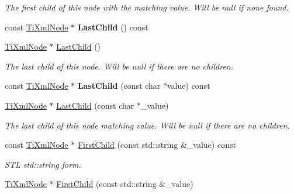 \begin{DoxyCompactItemize}
\begin{DoxyCompactList}\small\item\em The first child of this node with the matching \textquotesingle{}value\textquotesingle{}. Will be null if none found. \end{DoxyCompactList}\item 
const \hyperlink{class_ti_xml_node}{Ti\+Xml\+Node} $\ast$ {\bfseries Last\+Child} () const \hypertarget{class_ti_xml_node_a6d671107e00cca1d28cb2d7f3a87a21e}{}\label{class_ti_xml_node_a6d671107e00cca1d28cb2d7f3a87a21e}

\item 
\hyperlink{class_ti_xml_node}{Ti\+Xml\+Node} $\ast$ \hyperlink{class_ti_xml_node_a6432d2b2495f6caf9cb4278df706a031}{Last\+Child} ()\hypertarget{class_ti_xml_node_a6432d2b2495f6caf9cb4278df706a031}{}\label{class_ti_xml_node_a6432d2b2495f6caf9cb4278df706a031}

\begin{DoxyCompactList}\small\item\em The last child of this node. Will be null if there are no children. \end{DoxyCompactList}\item 
const \hyperlink{class_ti_xml_node}{Ti\+Xml\+Node} $\ast$ {\bfseries Last\+Child} (const char $\ast$value) const \hypertarget{class_ti_xml_node_acdd3fdc436aa7433023310a041e5e63f}{}\label{class_ti_xml_node_acdd3fdc436aa7433023310a041e5e63f}

\item 
\hyperlink{class_ti_xml_node}{Ti\+Xml\+Node} $\ast$ \hyperlink{class_ti_xml_node_abad5bf1059c48127b958711ef89e8e5d}{Last\+Child} (const char $\ast$\+\_\+value)\hypertarget{class_ti_xml_node_abad5bf1059c48127b958711ef89e8e5d}{}\label{class_ti_xml_node_abad5bf1059c48127b958711ef89e8e5d}

\begin{DoxyCompactList}\small\item\em The last child of this node matching \textquotesingle{}value\textquotesingle{}. Will be null if there are no children. \end{DoxyCompactList}\item 
const \hyperlink{class_ti_xml_node}{Ti\+Xml\+Node} $\ast$ \hyperlink{class_ti_xml_node_a07f6200a5956c723c5b52d70f29c46f6}{First\+Child} (const std\+::string \&\+\_\+value) const \hypertarget{class_ti_xml_node_a07f6200a5956c723c5b52d70f29c46f6}{}\label{class_ti_xml_node_a07f6200a5956c723c5b52d70f29c46f6}

\begin{DoxyCompactList}\small\item\em S\+TL std\+::string form. \end{DoxyCompactList}\item 
\hyperlink{class_ti_xml_node}{Ti\+Xml\+Node} $\ast$ \hyperlink{class_ti_xml_node_a10d2669ccb5e29e02fcb0e4408685ef6}{First\+Child} (const std\+::string \&\+\_\+value)\hypertarget{class_ti_xml_node_a10d2669ccb5e29e02fcb0e4408685ef6}{}\label{class_ti_xml_node_a10d2669ccb5e29e02fcb0e4408685ef6}


\end{DoxyCompactItemize}
